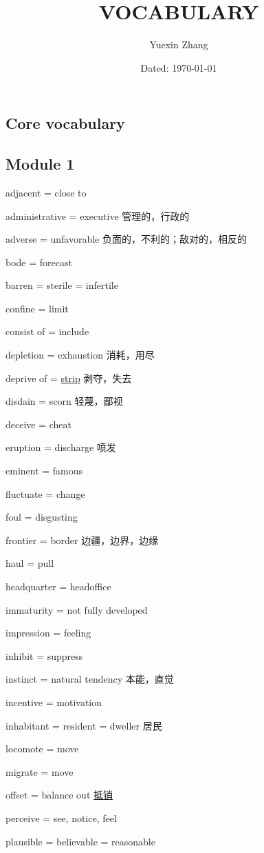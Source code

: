 \documentclass[UTF8, fontset = none, zihao = -4, linespread = 1.1]{ctexart}
\title{\vspace{-1in} VOCABULARY}
\author{\kaishu Yuexin Zhang}
\date{Dated: \today}
\begin{document}
\maketitle

\begin{multicols}{2}
\section{Core vocabulary}
\subsection*{Module 1}
adjacent = close to

administrative = executive 管理的，行政的

adverse = unfavorable 负面的，不利的；敌对的，相反的

bode = forecast

barren = sterile = infertile

confine = limit

consist of = include

depletion = exhaustion 消耗，用尽

deprive of = \underline{strip} 剥夺，失去

disdain = scorn 轻蔑，鄙视

deceive = cheat

eruption = discharge 喷发

eminent = famous

fluctuate = change

foul = disgusting

frontier = border 边疆，边界，边缘

haul = pull

headquarter = headoffice

immaturity = not fully developed

impression = feeling

inhibit = suppress

instinct = natural tendency 本能，直觉

incentive = motivation

inhabitant = resident = dweller 居民

locomote = move

migrate = move

offset = balance out \underline{抵销}

perceive = see, notice, feel

plausible = believable = reasonable


\end{multicols}
\end{document}
